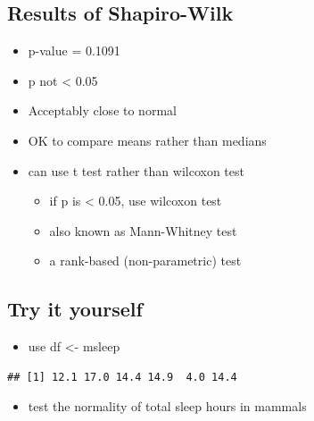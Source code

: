 \documentclass[
]{book}
\newenvironment{Shaded}{\begin{snugshade}}{\end{snugshade}}
\newcommand{\KeywordTok}[1]{\textcolor[rgb]{0.13,0.29,0.53}{\textbf{#1}}}
\newcommand{\NormalTok}[1]{#1}
\newcommand{\OperatorTok}[1]{\textcolor[rgb]{0.81,0.36,0.00}{\textbf{#1}}}
\newcommand{\StringTok}[1]{\textcolor[rgb]{0.31,0.60,0.02}{#1}}
\providecommand{\tightlist}{%
  \setlength{\itemsep}{0pt}\setlength{\parskip}{0pt}}
\begin{document}
\hypertarget{results-of-shapiro-wilk}{%
\subsection{Results of Shapiro-Wilk}\label{results-of-shapiro-wilk}}

\begin{itemize}
\tightlist
\item
  p-value = 0.1091
\item
  p not \textless{} 0.05
\item
  Acceptably close to normal
\item
  OK to compare means rather than medians
\item
  can use t test rather than wilcoxon test

  \begin{itemize}
  \tightlist
  \item
    if p is \textless{} 0.05, use wilcoxon test
  \item
    also known as Mann-Whitney test
  \item
    a rank-based (non-parametric) test
  \end{itemize}
\end{itemize}

\hypertarget{try-it-yourself}{%
\subsection{Try it yourself}\label{try-it-yourself}}

\begin{itemize}
\tightlist
\item
  use df \textless- msleep
\end{itemize}

\begin{Shaded}
\end{Shaded}

\begin{verbatim}
## [1] 12.1 17.0 14.4 14.9  4.0 14.4
\end{verbatim}

\begin{itemize}
\tightlist
\item
  test the normality of total sleep hours in mammals
\end{itemize}
\end{document}
